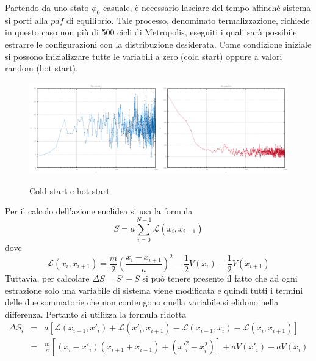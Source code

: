 Partendo da uno stato $\phi_0$ casuale, è necessario lasciare del tempo affinchè sistema si porti alla $pdf$ di equilibrio. Tale processo, denominato termalizzazione, richiede in questo caso non più di 500 cicli di Metropolis, eseguiti i quali sarà possibile estrarre le configurazioni con la distribuzione desiderata. Come condizione iniziale si possono inizializzare tutte le variabili a zero (cold start) oppure a valori random (hot start).
\begin{figure}[H]
\centering
\includegraphics[width=0.5\textwidth]{action1}\includegraphics[width=0.5\textwidth]{action2}
\caption{Cold start e hot start}
\label{fig:action}
\end{figure}
Per il calcolo dell'azione euclidea si usa la formula
$$S = a\displaystyle\sum\limits_{i=0}^{N-1} \mathcal{L}(x_{i},x_{i+1})$$
dove
$$\mathcal{L}(x_{i},x_{i+1}) = \frac{m}{2}\left(\frac{x_{i}-x_{i+1}}{a}\right)^{2}-\frac{1}{2}V(x_{i})-\frac{1}{2}V(x_{i+1})$$
Tuttavia, per calcolare $\Delta S = S'-S$ si può tenere presente il fatto che ad ogni estrazione solo una variabile di sistema viene modificata e quindi tutti i termini delle due sommatorie che non contengono quella variabile si elidono nella differenza. Pertanto si utilizza la formula ridotta
\begin{eqnarray*}
 \Delta S_i &=& a[\mathcal{L}(x_{i-1},x'_{i})+\mathcal{L}(x'_{i},x_{i+1})-\mathcal{L}(x_{i-1},x_{i})-\mathcal{L}(x_{i},x_{i+1})]\\
   &=& \tfrac{m}{a}[(x_{i}-x'_{i})(x_{i+1}+x_{i-1})+(x'^2_i-x^2_i)]+aV(x'_i)-aV(x_i)
\end{eqnarray*}

